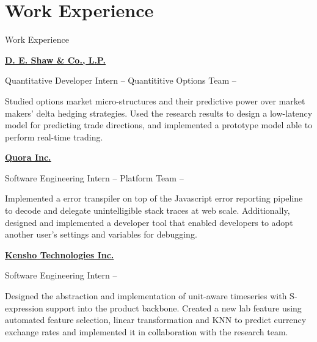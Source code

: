 
\section{Work Experience}
{Work Experience}

\href{https://www.deshaw.com/}
{\textbf{D. E. Shaw \& Co., L.P.}}
\par
Quantitative Developer Intern -- Quantititive Options Team
\hfill
\textbf{} --
\textbf{}

\SmallEntryGap
\begin{detail}
Studied options market micro-structures and their predictive power over market makers' delta hedging strategies.
Used the research results to design a low-latency model for predicting trade directions,
and implemented a prototype model able to perform real-time trading.
\end{detail}
\EntryGap
\href{https://www.quora.com/}
{\textbf{Quora Inc.}}
\par
Software Engineering Intern -- Platform Team
\hfill
\textbf{} --
\textbf{}

\SmallEntryGap
\begin{detail}
Implemented a error transpiler on top of the Javascript error reporting pipeline to decode and delegate unintelligible stack traces at web scale.
Additionally, designed and implemented a developer tool that enabled developers to adopt another user's settings and variables for debugging.
\end{detail}

\EntryGap
\href{https://www.kensho.com/}
{\textbf{Kensho Technologies Inc.}}
\par
Software Engineering Intern
\hfill
\textbf{} --
\textbf{}

\SmallEntryGap
\begin{detail}
Designed the abstraction and implementation of unit-aware timeseries with S-expression support into the product backbone. Created a new lab feature using automated feature selection, linear transformation and KNN to predict currency exchange rates and implemented it in collaboration with the research team.
\end{detail}
